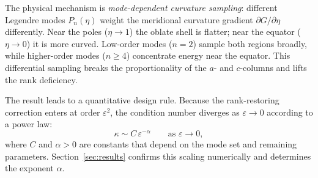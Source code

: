 The physical mechanism is \emph{mode-dependent curvature sampling}: different
Legendre modes $P_n(\eta)$ weight the meridional curvature gradient
$\partial G / \partial \eta$ differently.  Near the poles ($\eta \to 1$) the
oblate shell is flatter; near the equator ($\eta \to 0$) it is more curved.
Low-order modes ($n=2$) sample both regions broadly, while higher-order modes
($n \geq 4$) concentrate energy near the equator.  This differential sampling
breaks the proportionality of the $a$- and $c$-columns and lifts the rank
deficiency.

The result leads to a quantitative design rule.  Because the rank-restoring
correction enters at order $\varepsilon^2$, the condition number diverges as
$\varepsilon \to 0$ according to a power law:
\begin{equation}\label{eq:kappa_powerlaw}
  \kappa \sim C\,\varepsilon^{-\alpha}
  \qquad \text{as } \varepsilon \to 0,
\end{equation}
where $C$ and $\alpha > 0$ are constants that depend on the mode set and
remaining parameters.  Section~\ref{sec:results} confirms this scaling
numerically and determines the exponent $\alpha$.
